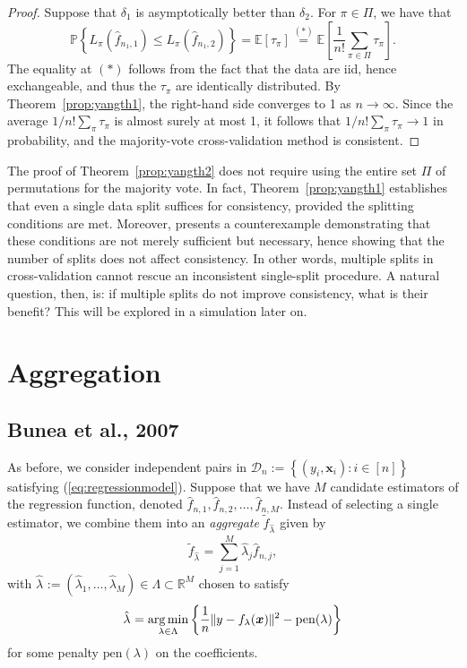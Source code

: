 \documentclass[12pt, letter paper]{article}
\newcommand{\1}{\mathmybb{1}}
\DeclareMathOperator*{\argmin}{arg\,min}
\newcommand{\R}{\mathbb{R}}
\newcommand{\0}{\emptyset}
\newcommand{\prob}{\mathbb{P}}
\newcommand{\Ep}[1]{\mathbb{E}\left[ #1 \right]}
\newcommand{\paren}[1]{\left(#1 \right)}
\newcommand{\set}[1]{\left\{ #1 \right\}}
\newcommand{\norm}[1]{|\hspace{-1pt}|#1 |\hspace{-1pt}|}
\newcommand{\normsq}[1]{\norm{#1}^{2}}
\newcommand{\data}{\mathcal{D}_{n}}
\newcommand{\x}{\boldsymbol{x}}
\newcommand{\fhat}[2]{\hat{f}_{#1, #2}}
\newcommand{\ftilde}[1]{\tilde{f}_{#1}}
\newcommand{\lambdahat}[1]{\hat{\lambda}_{#1}}
\begin{document}
\begin{proof}
    Suppose that \(\delta_{1}\) is asymptotically better than \(\delta_{2}\). For \(\pi\in \Pi\), we have that
    \[\prob\set{L_{\pi}\paren{\fhat{n_{1}}{1}} \leq L_{\pi}\paren{\fhat{n_{1}}{2}}} = \Ep{\tau_{\pi}} \stackrel{(*)}{=} \Ep{\frac{1}{n!}\sum_{\pi\in\Pi}\tau_{\pi}}.\]
    The equality at \((*)\) follows from the fact that the data are iid, hence exchangeable, and thus the \(\tau_\pi\) are identically distributed. By Theorem~\ref{prop:yangth1}, the right-hand side converges to 1 as \(n\to\infty\). Since the average \(1/n! \sum_{\pi}\tau_{\pi}\) is almost surely at most 1, it follows that \(1/n! \sum_{\pi}\tau_{\pi} \to 1\) in probability, and the majority-vote cross-validation method is consistent.
\end{proof}

The proof of Theorem~\ref{prop:yangth2} does not require using the entire set \(\Pi\) of permutations for the majority vote. In fact, Theorem~\ref{prop:yangth1} establishes that even a single data split suffices for consistency, provided the splitting conditions are met. Moreover, \textcite{yang_2007} presents a counterexample demonstrating that these conditions are not merely sufficient but necessary, hence showing that the number of splits does not affect consistency. In other words, multiple splits in cross-validation cannot rescue an inconsistent single-split procedure. A natural question, then, is: if multiple splits do not improve consistency, what is their benefit? This will be explored in a simulation later on.



\section{Aggregation}
\subsection{Bunea et al., 2007}

As before, we consider independent pairs in \(\data := \set{\paren{y_{i}, \x_{i}}:i\in [n]}\) satisfying (\ref{eq:regressionmodel}). Suppose that we have \(M\) candidate estimators of the regression function, denoted \(\fhat{n}{1}, \fhat{n}{2}, \ldots, \fhat{n}{M}\). Instead of selecting a single estimator, we combine them into an \emph{aggregate} \(\ftilde{\lambdahat{}}\) given by
\[\ftilde{\lambdahat{}} = \sum_{j=1}^{M}\lambdahat{j} \fhat{n}{j},\]
with \(\lambdahat{}:=\paren{\lambdahat{1}, \ldots, \lambdahat{M}}\in \Lambda\subset\R^{M}\) chosen to satisfy
\begin{equation}\label{eq:weights}
    \lambdahat{} = \argmin_{\lambda\in\Lambda}\set{\frac{1}{n}\normsq{y - f_{\lambda}(\x)} - \mathrm{pen}(\lambda)}
\end{equation}
for some penalty \(\mathrm{pen}(\lambda)\) on the coefficients.
\end{document}
